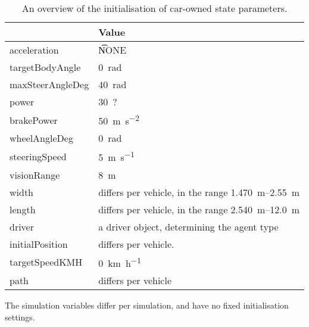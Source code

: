 \begin{table}
	\centering
	\begin{tabularx}{\textwidth}{>{\ttfamily}lX}
		\toprule
		\normalfont{Parameter}	& Value \\  
		\midrule
		acceleration 			
			& \t{NONE} \\ 
		targetBodyAngle 		
			& \SI[mode=text]{0}{\radian} \\ 
		maxSteerAngleDeg 		
			& \SI[mode=text]{40}{\radian} \\ 
		power 					
			& \SI[mode=text]{30}{?}\\ 
		brakePower 		
			& \SI{50}{\meter\per\square\second}\\
		wheelAngleDeg 			
			& \SI[mode=text]{0}{\radian} \\ 
		steeringSpeed 			
			& \SI[mode=text]{5}{\meter\per\second} \\ 
		visionRange 			
			& \SI[mode=text]{8}{\meter} \\ 
		width 					
			& differs per vehicle, in the range \SIrange{1.470}{2.55}{\meter} \\ 
		length 					
			& differs per vehicle, in the range \SIrange{2.540}{12.0}{\meter} \\ 
		driver 					
			& a driver object, determining the agent type \\
		initialPosition 		
			& differs per vehicle. \\ 
		targetSpeedKMH			
			& \SI[mode=text]{0}{\kilo\meter\per\hour} \\ 
		path					
			& differs per vehicle \\ 		
		\bottomrule
	\end{tabularx}
	\caption{An overview of the initialisation of car-owned state parameters.}
	\label{tab:par:method:model:details:init:car:value}
\end{table} 


The simulation variables differ per simulation, and have no fixed initialisation settings.


